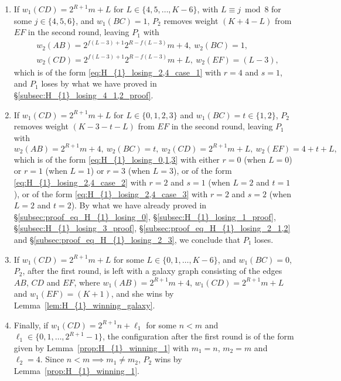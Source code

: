\documentclass[11pt,reqno]{amsart}
\theoremstyle{definition}
\theoremstyle{definition}
\begin{document}
\begin{enumerate}
\begin{enumerate}
\item If $w_{1}(CD)=2^{R+1}m+L$ for $L \in \{4,5,\ldots,K-6\}$, with $L \equiv j \bmod 8$ for some $j \in \{4,5,6\}$, and $w_{1}(BC)=1$, $P_{2}$ removes weight $(K+4-L)$ from $EF$ in the second round, leaving $P_{1}$ with
\begin{align}
{}&w_{2}(AB)=2^{f(L-3)+1}2^{R-f(L-3)}m+4,\ w_{2}(BC)=1,\nonumber\\
{}&w_{2}(CD)=2^{f(L-3)+1}2^{R-f(L-3)}m+L,\ w_{2}(EF)=(L-3),\nonumber
\end{align}
which is of the form \eqref{eq:H_{1}_losing_2,4_case_1} with $r=4$ and $s=1$, and $P_{1}$ loses by what we have proved in \S\ref{subsec:H_{1}_losing_4_1,2_proof}.

\item If $w_{1}(CD)=2^{R+1}m+L$ for $L \in \{0,1,2,3\}$ and $w_{1}(BC)=t\in\{1,2\}$, $P_{2}$ removes weight $(K-3-t-L)$ from $EF$ in the second round, leaving $P_{1}$ with
\begin{equation}
w_{2}(AB)=2^{R+1}m+4,\ w_{2}(BC)=t,\ w_{2}(CD)=2^{R+1}m+L,\ w_{2}(EF)=4+t+L,\nonumber
\end{equation}
which is of the form \eqref{eq:H_{1}_losing_0,1,3} with either $r=0$ (when $L=0$) or $r=1$ (when $L=1$) or $r=3$ (when $L=3$), or of the form \eqref{eq:H_{1}_losing_2,4_case_2} with $r=2$ and $s=1$ (when $L=2$ and $t=1$), or of the form \eqref{eq:H_{1}_losing_2,4_case_3} with $r=2$ and $s=2$ (when $L=2$ and $t=2$). By what we have already proved in \S\ref{subsec:proof_eq_H_{1}_losing_0}, \S\ref{subsec:H_{1}_losing_1_proof}, \S\ref{subsec:H_{1}_losing_3_proof}, \S\ref{subsec:proof_eq_H_{1}_losing_2_1,2} and \S\ref{subsec:proof_eq_H_{1}_losing_2_3}, we conclude that $P_{1}$ loses.

\item If $w_{1}(CD)=2^{R+1}m+L$ for some $L \in \{0,1,\ldots,K-6\}$, and $w_{1}(BC)=0$, $P_{2}$, after the first round, is left with a galaxy graph consisting of the edges $AB$, $CD$ and $EF$, where $w_{1}(AB)=2^{R+1}m+4$, $w_{1}(CD)=2^{R+1}m+L$ and $w_{1}(EF)=(K+1)$, and she wins by Lemma~\ref{lem:H_{1}_winning_galaxy}.

\item Finally, if $w_{1}(CD)=2^{R+1}n+\ell_{1}$ for some $n<m$ and $\ell_{1}\in\{0,1,\ldots,2^{R+1}-1\}$, the configuration after the first round is of the form given by Lemma~\ref{prop:H_{1}_winning_1} with $m_{1}=n$, $m_{2}=m$ and $\ell_{2}=4$. Since $n<m \implies m_{1}\neq m_{2}$, $P_{2}$ wins by Lemma~\ref{prop:H_{1}_winning_1}.
\end{enumerate}


\end{enumerate}
\end{document}
